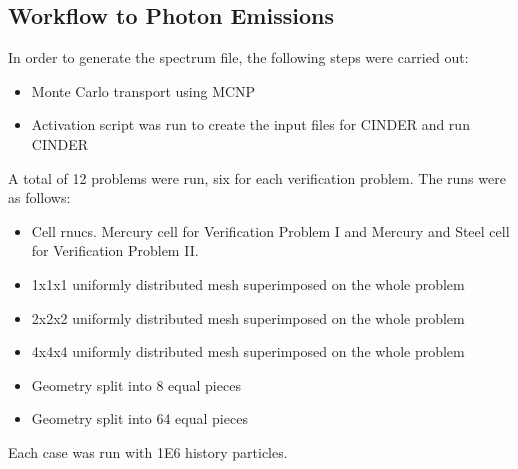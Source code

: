 \subsection{Workflow to Photon Emissions}
In order to generate the spectrum file, the following steps were carried out:
\begin{itemize}
\item Monte Carlo transport using MCNP 
\item Activation script was run to create the input files for CINDER and  run CINDER
\end{itemize}
A total of 12 problems were run, six for each verification problem. The runs were as follows:
\begin{itemize}
\item Cell rnucs. Mercury cell for Verification Problem I and Mercury and Steel cell for
Verification Problem II.
\item 1x1x1 uniformly distributed mesh superimposed on the whole problem
\item 2x2x2 uniformly distributed mesh superimposed on the whole problem
\item 4x4x4 uniformly distributed mesh superimposed on the whole problem
\item Geometry split into 8 equal pieces
\item Geometry split into 64 equal pieces
\end{itemize}
Each case was run with 1E6 history particles. 

\newpage
